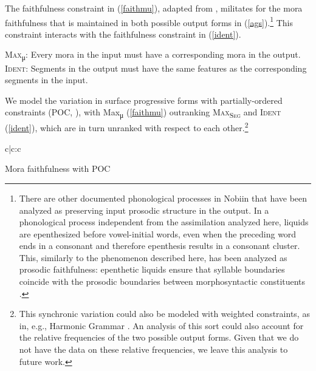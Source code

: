 \documentclass[output=paper]{langscibook}
\begin{document}
\z

The faithfulness constraint in (\ref{faithmu}), adapted from \citet{davissinhala}, militates for the mora faithfulness that is maintained in both possible output forms in (\ref{ags}).\footnote{There are other documented phonological processes in Nobiin that have been analyzed as preserving input prosodic structure in the output. In a phonological process independent from the assimilation analyzed here, liquids are epenthesized before vowel-initial words, even when the preceding word ends in a consonant and therefore epenthesis results in a consonant cluster. This, similarly to the phenomenon described here, has been analyzed as prosodic faithfulness: epenthetic liquids ensure that syllable boundaries coincide with the prosodic boundaries between morphosyntactic constituents \citep{barzilaispips}.} This constraint interacts with the faithfulness constraint in (\ref{ident}).\largerpage

\ea

\begin{xlist}

\ex \label{faithmu} \textsc{Max}\textsubscript{μ}: Every mora in the input must have a corresponding mora in the output.
\ex \label{ident} \textsc{Ident}: Segments in the output must have the same features as the corresponding segments in the input.

\end{xlist}

\z

\begin{sloppypar}
We model the variation in surface progressive forms with partially-ordered constraints (POC, \citealt{coetzee2006, anttila}), with Max\textsubscript{μ} (\ref{faithmu}) outranking  \textsc{Max\textsubscript{Seg}} and \textsc{Ident} (\ref{ident}), which are in turn unranked with respect to each other.\footnote{This synchronic variation could also be modeled with weighted constraints, as in, e.g., Harmonic Grammar \citep{HG}. An analysis of this sort could also account for the relative frequencies of the two possible output forms. Given that we do not have the data on these relative frequencies, we leave this analysis to future work.}
\end{sloppypar}

\begin{table}
\ShadingOn
\begin{tableau}{c|c:c}
              
         \vio{*!}                                    \vio{*}                                         \vio{}
         \vio{*!}                                    \vio{*}                                         \vio{}
 \vio{}                                   \vio{}                                          \vio{*}
  \vio{}                                  \vio{*}                                         \vio{}
\end{tableau}
\caption{Mora faithfulness with POC} \label{POC}
\end{table}
\end{document}
